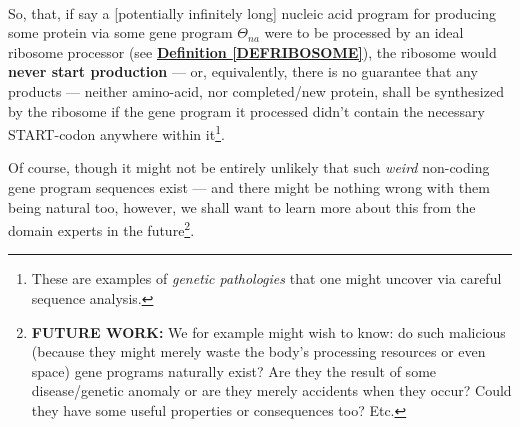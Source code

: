 \documentclass[a4paper, 18pt]{book} %
\newtheorem{law}{Law}
\begin{document}
\begin{center}
\\
\end{center}


So, that, if say a [potentially infinitely long] nucleic acid program for producing some protein via some gene program $\Theta_{na}$ were to be processed by an ideal ribosome processor (see \textbf{\hyperref[DEFRIBOSOME]{Definition \ref{DEFRIBOSOME}}}), the ribosome would \textbf{never start production} --- or, equivalently, there is no guarantee that any products --- neither amino-acid, nor completed/new protein, shall be synthesized by the ribosome if the gene program it processed didn't contain the necessary START-codon anywhere within it\footnote{These are examples of \textit{genetic pathologies} that one might uncover via careful sequence analysis.}.

Of course, though it might not be entirely unlikely that such \textit{weird} non-coding gene program sequences exist --- and there might be nothing wrong with them being natural too, however, we shall want to learn more about this from the domain experts in the future\footnote{\textbf{FUTURE WORK:} We for example might wish to know: do such malicious (because they might merely waste the body's processing resources or even space) gene programs naturally exist? Are they the result of some disease/genetic anomaly or are they merely accidents when they occur? Could they have some useful properties or consequences too? Etc.}.
\end{document}

